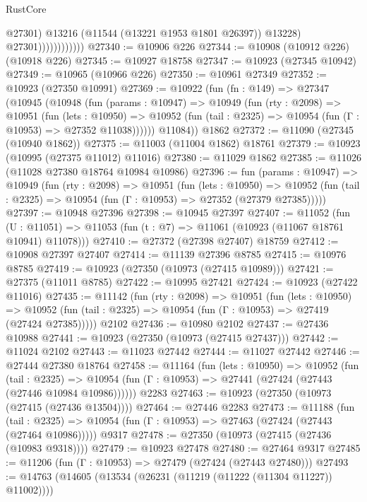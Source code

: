 \begin{lexlean}{RustCore}
\begin{coremodule}
                                @27301)
                              @13216
                              (@11544 (@13221 @1953 @1801 @26397))
                              @13228)
                            @27301))))))))))))
@27340 := @10906 @226
@27344 := @10908 (@10912 @226) (@10918 @226)
@27345 := @10927 @18758
@27347 := @10923 (@27345 @10942)
@27349 := @10965 (@10966 @226)
@27350 := @10961 @27349
@27352 := @10923 (@27350 @10991)
@27369 := @10922
    (fun (fn : @149) =>
    @27347
      (@10945
        (@10948
          (fun (params : @10947) =>
          @10949
            (fun (rty : @2098) =>
            @10951
              (fun (lets : @10950) =>
              @10952 (fun (tail : @2325) => @10954 (fun (Γ : @10953) => @27352 @11038))))))
        @11084))
    @1862
@27372 := @11090 (@27345 (@10940 @1862))
@27375 := @11003 (@11004 @1862) @18761
@27379 := @10923 (@10995 (@27375 @11012) @11016)
@27380 := @11029 @1862
@27385 := @11026 (@11028 @27380 @18764 @10984 @10986)
@27396 := fun (params : @10947) =>
  @10949
    (fun (rty : @2098) =>
    @10951
      (fun (lets : @10950) =>
      @10952 (fun (tail : @2325) => @10954 (fun (Γ : @10953) => @27352 (@27379 @27385)))))
@27397 := @10948 @27396
@27398 := @10945 @27397
@27407 := @11052
    (fun (U : @11051) => @11053 (fun (t : @7) => @11061 (@10923 (@11067 @18761 @10941) @11078)))
@27410 := @27372 (@27398 @27407) @18759
@27412 := @10908 @27397 @27407
@27414 := @11139 @27396 @8785
@27415 := @10976 @8785
@27419 := @10923 (@27350 (@10973 (@27415 @10989)))
@27421 := @27375 (@11011 @8785)
@27422 := @10995 @27421
@27424 := @10923 (@27422 @11016)
@27435 := @11142
    (fun (rty : @2098) =>
    @10951
      (fun (lets : @10950) =>
      @10952 (fun (tail : @2325) => @10954 (fun (Γ : @10953) => @27419 (@27424 @27385)))))
    @2102
@27436 := @10980 @2102
@27437 := @27436 @10988
@27441 := @10923 (@27350 (@10973 (@27415 @27437)))
@27442 := @11024 @2102
@27443 := @11023 @27442
@27444 := @11027 @27442
@27446 := @27444 @27380 @18764
@27458 := @11164
    (fun (lets : @10950) =>
    @10952
      (fun (tail : @2325) =>
      @10954 (fun (Γ : @10953) => @27441 (@27424 (@27443 (@27446 @10984 @10986))))))
    @2283
@27463 := @10923 (@27350 (@10973 (@27415 (@27436 @13504))))
@27464 := @27446 @2283
@27473 := @11188
    (fun (tail : @2325) => @10954 (fun (Γ : @10953) => @27463 (@27424 (@27443 (@27464 @10986)))))
    @9317
@27478 := @27350 (@10973 (@27415 (@27436 (@10983 @9318))))
@27479 := @10923 @27478
@27480 := @27464 @9317
@27485 := @11206 (fun (Γ : @10953) => @27479 (@27424 (@27443 @27480)))
@27493 := @14763 (@14605 (@13534 (@26231 (@11219 (@11222 (@11304 @11227)) @11002))))

\end{coremodule}
\end{lexlean}
